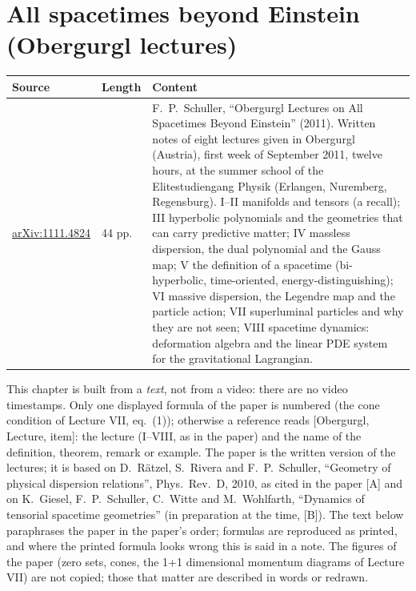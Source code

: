 \chapter{All spacetimes beyond Einstein (Obergurgl lectures)}\label{ch:c29}
\newcommand{\obg}[1]{{\footnotesize\textsf{[Obergurgl, #1]}}}
\newcommand{\Dfib}{D}
\begin{paracol}{2}

\begin{sources}
\begin{tabularx}{\linewidth}{@{}l l L@{}}
\toprule
\textbf{Source} & \textbf{Length} & \textbf{Content}\\
\midrule
\href{https://arxiv.org/abs/1111.4824}{arXiv:1111.4824} & 44 pp. & F.~P.~Schuller, ``Obergurgl Lectures on All Spacetimes Beyond Einstein'' (2011). Written notes of eight lectures given in Obergurgl (Austria), first week of September 2011, twelve hours, at the summer school of the Elitestudiengang Physik (Erlangen, Nuremberg, Regensburg). I--II manifolds and tensors (a recall); III hyperbolic polynomials and the geometries that can carry predictive matter; IV massless dispersion, the dual polynomial and the Gauss map; V the definition of a spacetime (bi-hyperbolic, time-oriented, energy-distinguishing); VI massive dispersion, the Legendre map and the particle action; VII superluminal particles and why they are not seen; VIII spacetime dynamics: deformation algebra and the linear PDE system for the gravitational Lagrangian.\\
\bottomrule
\end{tabularx}

\smallskip
This chapter is built from a \emph{text}, not from a video: there are no video timestamps. Only one displayed formula of the paper is numbered (the cone condition of Lecture VII, eq.~(1)); otherwise a reference reads \obg{Lecture, item}: the lecture (I--VIII, as in the paper) and the name of the definition, theorem, remark or example. The paper is the written version of the lectures; it is based on D.~R\"atzel, S.~Rivera and F.~P.~Schuller, ``Geometry of physical dispersion relations'', Phys.\ Rev.\ D, 2010, as cited in the paper [A] and on K.~Giesel, F.~P.~Schuller, C.~Witte and M.~Wohlfarth, ``Dynamics of tensorial spacetime geometries'' (in preparation at the time, [B]). The text below paraphrases the paper in the paper's order; formulas are reproduced as printed, and where the printed formula looks wrong this is said in a note. The figures of the paper (zero sets, cones, the 1+1 dimensional momentum diagrams of Lecture VII) are not copied; those that matter are described in words or redrawn.
\end{sources}


\end{paracol}
